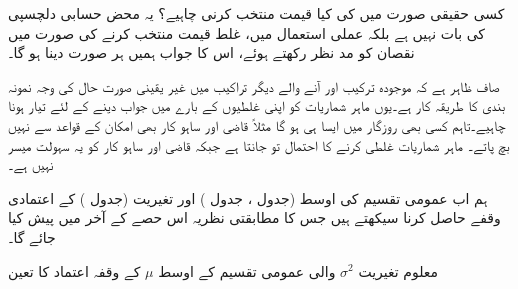 کسی حقیقی صورت میں  کی کیا قیمت منتخب کرنی چاہیے؟ یہ محض حسابی دلچسپی کی بات نہیں ہے بلکہ عملی استعمال میں، غلط قیمت منتخب کرنے  کی صورت میں نقصان کو مد نظر رکھتے ہوئے، اس کا جواب ہمیں ہر صورت دینا ہو گا۔

صاف ظاہر ہے کہ موجودہ ترکیب اور آنے والے دیگر تراکیب میں غیر یقینی صورت حال کی وجہ نمونہ بندی کا طریقہ کار ہے۔یوں ماہر شماریات کو اپنی غلطیوں کے بارے میں جواب دینے کے لئے تیار ہونا چاہیے۔تاہم کسی بھی روزگار  میں ایسا ہی ہو گا مثلاً قاضی اور ساہو کار بھی امکان کے قواعد سے نہیں بچ پاتے۔ ماہر شماریات غلطی کرنے کا احتمال تو جانتا ہے جبکہ قاضی اور ساہو کار کو 
یہ سہولت میسر نہیں ہے۔

ہم اب عمومی تقسیم کی اوسط  (جدول ، جدول )  اور تغیریت  (جدول ) کے اعتمادی وقفے  حاصل کرنا سیکھتے ہیں جس کا مطابقتی نظریہ اس حصے کے آخر میں پیش کیا جائے گا۔\\
\begin{table}
\caption{معلوم تغیریت $\sigma^2$ والی عمومی تقسیم کے اوسط $\mu$ کے وقفہ اعتماد کا تعین}
\label{جدول_شماریات_وقفہ_اعتماد_الف}
\centering
{}
\end{table}
\quad {}\\
